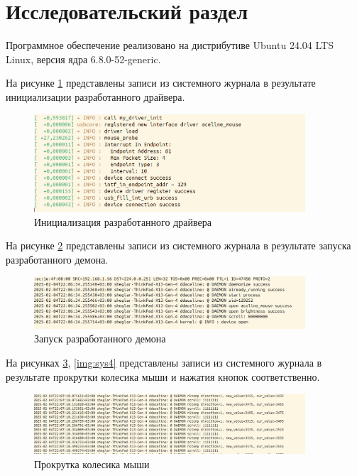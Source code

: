 \section{Исследовательский раздел}

Программное обеспечение реализовано на дистрибутиве Ubuntu 24.04 LTS Linux, версия ядра 6.8.0-52-generic.

На рисунке \ref{img:sys1} представлены записи из системного журнала в результате инициализации разработанного драйвера.

\begin{figure}[!htb]\centering
	\includegraphics[width=0.9\textwidth]{../img/sys1.png}
	\caption{Инициализация разработанного драйвера}
	\label{img:sys1}
\end{figure}

На рисунке \ref{img:sys2} представлены записи из системного журнала в результате запуска разработанного демона.

\begin{figure}[!htb]\centering
	\includegraphics[width=0.9\textwidth]{../img/sys2.png}
	\caption{Запуск разработанного демона}
	\label{img:sys2}
\end{figure}

На рисунках \ref{img:sys3}, \ref{img:sys4} представлены записи из системного журнала в результате прокрутки колесика мыши и нажатия кнопок соответственно.

\begin{figure}[!htb]\centering
	\includegraphics[width=0.9\textwidth]{../img/sys3.png}
	\caption{Прокрутка колесика мыши}
	\label{img:sys3}
\end{figure}

